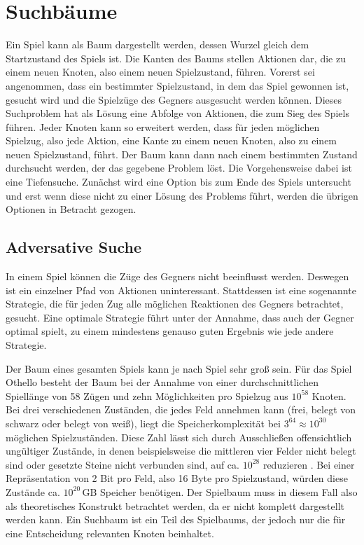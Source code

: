 \section{Suchbäume}
\label{sec:gametree}

Ein Spiel kann als Baum dargestellt werden, dessen Wurzel gleich dem Startzustand des Spiels ist. Die Kanten des Baums
stellen Aktionen dar, die zu einem neuen Knoten, also einem neuen Spielzustand, führen. Vorerst sei angenommen, dass ein
bestimmter Spielzustand, in dem das Spiel gewonnen ist, gesucht wird und die Spielzüge des Gegners ausgesucht werden
können. Dieses Suchproblem hat als Lösung eine Abfolge von Aktionen, die zum Sieg des Spiels führen. Jeder Knoten kann
so erweitert werden, dass für jeden möglichen Spielzug, also jede Aktion, eine Kante zu einem neuen Knoten, also zu
einem neuen Spielzustand, führt. Der Baum kann dann nach einem bestimmten Zustand durchsucht werden, der das gegebene
Problem löst. Die Vorgehensweise dabei ist eine Tiefensuche. Zunächst wird eine Option bis zum Ende des Spiels
untersucht und erst wenn diese nicht zu einer Lösung des Problems führt, werden die übrigen Optionen in Betracht
gezogen.
\cite[S.~75]{ai2010russel}

\subsection{Adversative Suche}
In einem Spiel können die Züge des Gegners nicht beeinflusst werden. Deswegen ist ein einzelner Pfad von Aktionen
uninteressant. Stattdessen ist eine sogenannte Strategie, die für jeden Zug alle möglichen Reaktionen des Gegners betrachtet,
gesucht. Eine optimale Strategie führt unter der Annahme, dass auch der Gegner optimal spielt, zu einem mindestens
genauso guten Ergebnis wie jede andere Strategie.
\cite[S.~163f.]{ai2010russel}

Der Baum eines gesamten Spiels kann je nach Spiel sehr groß sein. Für das Spiel Othello besteht der Baum bei der Annahme
von einer durchschnittlichen Spiellänge von 58 Zügen und zehn Möglichkeiten pro Spielzug aus $10^{58}$ Knoten. Bei drei
verschiedenen Zuständen, die jedes Feld annehmen kann (frei, belegt von schwarz oder belegt von weiß), liegt die
Speicherkomplexität bei $3^{64}\approx10^{30}$ möglichen Spielzuständen. Diese Zahl lässt sich durch Ausschließen
offensichtlich ungültiger Zustände, in denen beispielsweise die mittleren vier Felder nicht belegt sind oder gesetzte
Steine nicht verbunden sind, auf ca. $10^{28}$ reduzieren \cite[S.~167]{searchingforsolutions}.
Bei einer Repräsentation von 2 Bit pro Feld, also 16 Byte pro Spielzustand, würden diese Zustände ca. $10^{20}$\,GB
Speicher benötigen. Der Spielbaum muss in diesem Fall also als theoretisches Konstrukt betrachtet werden, da er nicht
komplett dargestellt werden kann. Ein Suchbaum ist ein Teil des Spielbaums, der jedoch nur die für eine Entscheidung
relevanten Knoten beinhaltet.
\cite[S.~162f.]{ai2010russel}

